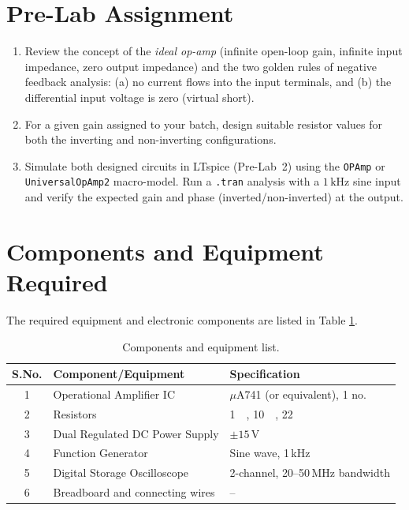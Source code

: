 \section{Pre-Lab Assignment}
\begin{enumerate}[label=(\roman*)]
	\item Review the concept of the \emph{ideal op-amp} (infinite open-loop gain, infinite input impedance, zero output impedance) and the two golden rules of negative feedback analysis: (a) no current flows into the input terminals, and (b) the differential input voltage is zero (virtual short).
	\item For a given gain assigned to your batch, design suitable resistor values for both the inverting and non-inverting configurations.
	\item Simulate both designed circuits in LTspice (Pre-Lab~2) using the \texttt{OPAmp} or \texttt{UniversalOpAmp2} macro-model. Run a \texttt{.tran} analysis with a $1\,\text{kHz}$ sine input and verify the expected gain and phase (inverted/non-inverted) at the output.
\end{enumerate}

\section{Components and Equipment Required}
The required equipment and electronic components are listed in Table \ref{tab:components_opamp}.
\begin{table}[h!]
	\centering
	\begin{tabular}{@{}cll@{}}
		\toprule
		S.No. & Component/Equipment & Specification \\
		\midrule
		1  & Operational Amplifier IC & $\mu$A741 (or equivalent), 1 no. \\
		2  & Resistors & \SI{1}{\kilo\Omega}, \SI{10}{\kilo\Omega}, \SI{22}{\kilo\Omega} \\
		3  & Dual Regulated DC Power Supply & $\pm 15\,\text{V}$ \\
		4  & Function Generator & Sine wave, 1\,kHz\\
		5  & Digital Storage Oscilloscope & 2-channel, 20--50\,MHz bandwidth \\
		6  & Breadboard and connecting wires & -- \\
		\bottomrule
	\end{tabular}
	\caption{Components and equipment list.}
		\label{tab:components_opamp}
\end{table}


